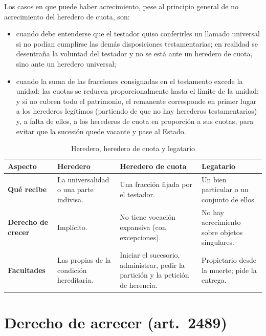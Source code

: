 \documentclass[12pt,oneside]{book}
\begin{document}
Los casos en que puede haber acrecimiento, pese al principio general de no acrecimiento del heredero de cuota, son:

\begin{itemize}
    \item cuando debe entenderse que el testador quiso conferirles un llamado universal si no podían cumplirse las demás disposiciones testamentarias; en realidad se desentraña la voluntad del testador y no se está ante un heredero de cuota, sino ante un heredero universal;
    \item cuando la suma de las fracciones consignadas en el testamento excede la unidad: las cuotas se reducen proporcionalmente hasta el límite de la unidad; y si no cubren todo el patrimonio, el remanente corresponde en primer lugar a los herederos legítimos (partiendo de que no hay herederos testamentarios) y, a falta de ellos, a los herederos de cuota en proporción a sus cuotas, para evitar que la sucesión quede vacante y pase al Estado.
\end{itemize}

\begin{table}[H]
\centering
\caption{Heredero, heredero de cuota y legatario}
\footnotesize
\begin{tabularx}{\textwidth}{@{}>{\raggedright\arraybackslash}p{2.3cm}>{\raggedright\arraybackslash}X>{\raggedright\arraybackslash}X>{\raggedright\arraybackslash}X@{}}
\toprule
\textbf{Aspecto} & \textbf{Heredero} & \textbf{Heredero de cuota} & \textbf{Legatario} \\
\midrule
\textbf{Qué recibe} & La universalidad o una parte indivisa. & Una fracción fijada por el testador. & Un bien particular o un conjunto de ellos. \\
\textbf{Derecho de crecer} & Implícito. & No tiene vocación expansiva (con excepciones). & No hay acrecimiento sobre objetos singulares. \\
\textbf{Facultades} & Las propias de la condición hereditaria. & Iniciar el sucesorio, administrar, pedir la partición y la petición de herencia. & Propietario desde la muerte; pide la entrega. \\
\bottomrule
\end{tabularx}
\end{table}

\section{Derecho de acrecer (art.~2489)}
\end{document}
